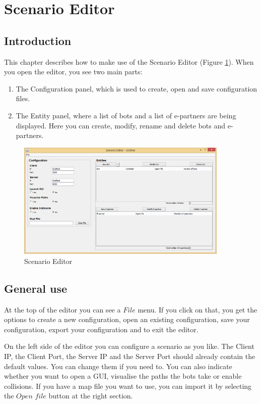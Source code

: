 \newpage
\section{Scenario Editor}


\subsection{Introduction}
This chapter describes how to make use of the Scenario Editor (Figure \ref{ScenarioEditor}). When you open the editor, you see two main parts:
\begin{enumerate}
\item The Configuration panel, which is used to create, open and save configuration files.
\item The Entity panel, where a list of bots and a list of e-partners are being displayed. Here you can create, modify, rename and delete bots and e-partners.
\end{enumerate}

\begin{figure}[h]
\begin{center}
\includegraphics[width=0.9\textwidth]{ScenarioEditor/editor.png}
\caption{Scenario Editor}
\label{ScenarioEditor}
\end{center}
\end{figure}

\subsection{General use}
At the top of the editor you can see a $File$ menu. If you click on that, you get the options to create a new configuration, open an existing configuration, save your configuration, export your configuration and to exit the editor.

On the left side of the editor you can configure a scenario as you like. The Client IP, the Client Port, the Server IP and the Server Port should already contain the default values. You can change them if you need to. You can also indicate whether you want to open a GUI, visualise the paths the bots take or enable collisions. If you have a map file you want to use, you can import it by selecting the $Open$ $file$ button at the right section.


